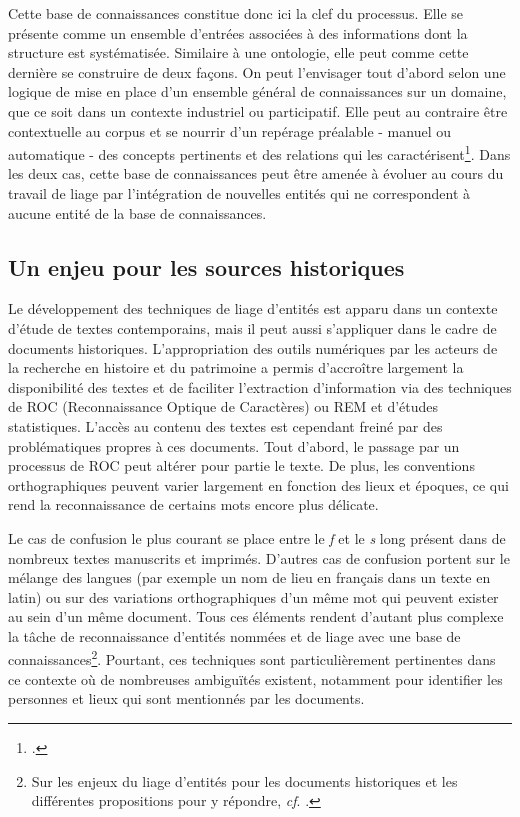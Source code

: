\documentclass[a4paper,12pt,twoside]{book}
\begin{document}
	Cette base de connaissances constitue donc ici la clef du processus. Elle se présente comme un ensemble d'entrées associées à des informations dont la structure est systématisée. Similaire à une ontologie, elle peut comme cette dernière se construire de deux façons. On peut l'envisager tout d'abord selon une logique de mise en place d'un ensemble général de connaissances sur un domaine, que ce soit dans un contexte industriel ou participatif. Elle peut au contraire être contextuelle au corpus et se nourrir d'un repérage préalable - manuel ou automatique - des concepts pertinents et des relations qui les caractérisent\footcite[p. 33]{stern_identification_2013}. Dans les deux cas, cette base de connaissances peut être amenée à évoluer au cours du travail de liage par l'intégration de nouvelles entités qui ne correspondent à aucune entité de la base de connaissances.
	
	\subsection{Un enjeu pour les sources historiques}
	
	Le développement des techniques de liage d'entités est apparu dans un contexte d'étude de textes contemporains, mais il peut aussi s'appliquer dans le cadre de documents historiques. L'appropriation des outils numériques par les acteurs de la recherche en histoire et du patrimoine a permis d'accroître largement la disponibilité des textes et de faciliter l'extraction d'information via des techniques de ROC (Reconnaissance Optique de Caractères) ou REM et d'études statistiques. L'accès au contenu des textes est cependant freiné par des problématiques propres à ces documents. Tout d'abord, le passage par un processus de ROC peut altérer pour partie le texte. De plus, les conventions orthographiques peuvent varier largement en fonction des lieux et époques, ce qui rend la reconnaissance de certains mots encore plus délicate.
	
	Le cas de confusion le plus courant se place entre le \textit{f} et le \textit{s} long présent dans de nombreux textes manuscrits et imprimés. D'autres cas de confusion portent sur le mélange des langues (par exemple un nom de lieu en français dans un texte en latin) ou sur des variations orthographiques d'un même mot qui peuvent exister au sein d'un même document. Tous ces éléments rendent d'autant plus complexe la tâche de reconnaissance d'entités nommées et de liage avec une base de connaissances\footnote{Sur les enjeux du liage d'entités pour les documents historiques et les différentes propositions pour y répondre, \textit{cf}. \cite{linhares_pontes_entity_2020}.}. Pourtant, ces techniques sont particulièrement pertinentes dans ce contexte où de nombreuses ambiguïtés existent, notamment pour identifier les personnes et lieux qui sont mentionnés par les documents.
	
\end{document}

